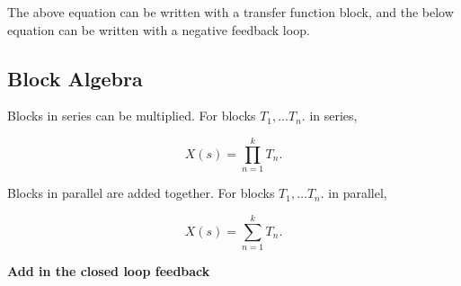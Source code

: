 \documentclass[12pt, a4paper]{report}
\begin{document}
  The above equation can be written with a transfer function block, and the below equation can be written with a negative feedback loop.

  \subsection{Block Algebra}

  Blocks in series can be multiplied. For blocks $ T_1, \ldots T_n. $ in series,

  \[
      X(s) = \prod_{n=1}^{k} T_n
    .\]

  Blocks in parallel are added together. For blocks $ T_1, \ldots T_n. $ in parallel,

  \[
      X(s) = \sum_{n=1}^{k} T_n
    .\]

  \textbf{Add in the closed loop feedback}
\end{document}
